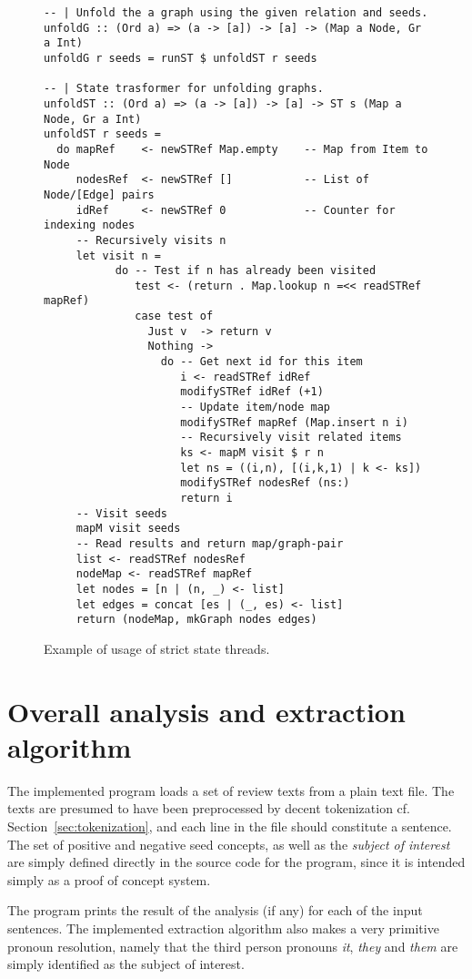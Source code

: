 \begin{figure}[ht]
\begin{cframed}{\textwidth}
\begin{lstlisting}[language=GHC]
-- | Unfold the a graph using the given relation and seeds.
unfoldG :: (Ord a) => (a -> [a]) -> [a] -> (Map a Node, Gr a Int)
unfoldG r seeds = runST $ unfoldST r seeds

-- | State trasformer for unfolding graphs.
unfoldST :: (Ord a) => (a -> [a]) -> [a] -> ST s (Map a Node, Gr a Int)
unfoldST r seeds =
  do mapRef    <- newSTRef Map.empty    -- Map from Item to Node
     nodesRef  <- newSTRef []           -- List of Node/[Edge] pairs
     idRef     <- newSTRef 0            -- Counter for indexing nodes
     -- Recursively visits n
     let visit n = 
           do -- Test if n has already been visited
              test <- (return . Map.lookup n =<< readSTRef mapRef)
              case test of
                Just v  -> return v
                Nothing -> 
                  do -- Get next id for this item
                     i <- readSTRef idRef
                     modifySTRef idRef (+1)
                     -- Update item/node map
                     modifySTRef mapRef (Map.insert n i)
                     -- Recursively visit related items
                     ks <- mapM visit $ r n 
                     let ns = ((i,n), [(i,k,1) | k <- ks])
                     modifySTRef nodesRef (ns:)
                     return i
     -- Visit seeds
     mapM visit seeds
     -- Read results and return map/graph-pair
     list <- readSTRef nodesRef         
     nodeMap <- readSTRef mapRef
     let nodes = [n | (n, _) <- list]
     let edges = concat [es | (_, es) <- list]
     return (nodeMap, mkGraph nodes edges)
\end{lstlisting}  
\end{cframed}
\caption{Example of usage of strict state threads.}
\label{fig:st}
\end{figure}
\clearpage

\section{Overall analysis and extraction algorithm}
\label{sec:program}
The implemented program loads a set of review texts from a plain text file. The texts are presumed to have been preprocessed by decent tokenization cf. Section~\ref{sec:tokenization}, and each line in the file should constitute a sentence. The set of positive and negative seed concepts, as well as the \emph{subject of interest} are simply defined directly in the source code for the program, since it is intended simply as a proof of concept system.

The program prints the result of the analysis (if any) for each of the input sentences. The implemented extraction algorithm also makes a very primitive pronoun resolution, namely that the third person pronouns \emph{it}, \emph{they} and \emph{them} are simply identified as the subject of interest.